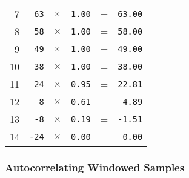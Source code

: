 {{\begin{tabular}{r|rcrcr}
7 & \texttt{63} & $\times$ & \texttt{1.00} & = & \texttt{63.00} \\
8 & \texttt{58} & $\times$ & \texttt{1.00} & = & \texttt{58.00} \\
9 & \texttt{49} & $\times$ & \texttt{1.00} & = & \texttt{49.00} \\
10 & \texttt{38} & $\times$ & \texttt{1.00} & = & \texttt{38.00} \\
11 & \texttt{24} & $\times$ & \texttt{0.95} & = & \texttt{22.81} \\
12 & \texttt{8} & $\times$ & \texttt{0.61} & = & \texttt{4.89} \\
13 & \texttt{-8} & $\times$ & \texttt{0.19} & = & \texttt{-1.51} \\
14 & \texttt{-24} & $\times$ & \texttt{0.00} & = & \texttt{0.00} \\
\end{tabular}
}
}

\clearpage

\subsubsection{Autocorrelating Windowed Samples}
\label{alac:autocorrelate}
{
\Return \AUTOCORRELATION\;
\EALGORITHM
}

